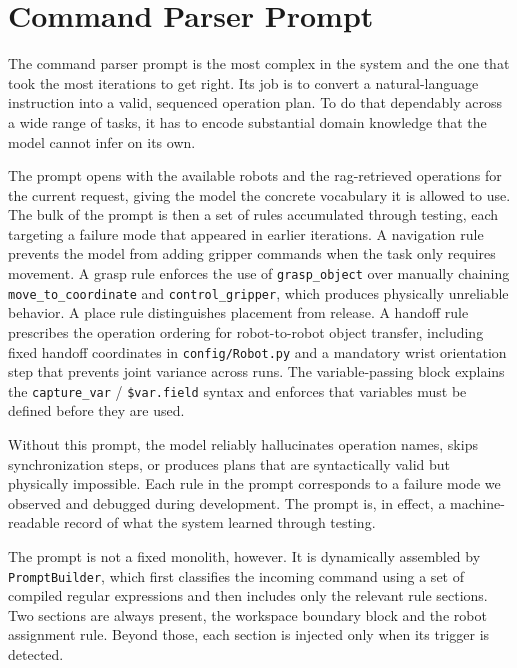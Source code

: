 \section{Command Parser Prompt}
The command parser prompt is the most complex in the system and the one that took the most iterations to get right. Its job is to convert a natural-language instruction into a valid, sequenced operation plan. To do that dependably across a wide range of tasks, it has to encode substantial domain knowledge that the model cannot infer on its own.

The prompt opens with the available robots and the \gls{rag}-retrieved operations for the current request, giving the model the concrete vocabulary it is allowed to use. The bulk of the prompt is then a set of rules accumulated through testing, each targeting a failure mode that appeared in earlier iterations. A navigation rule prevents the model from adding gripper commands when the task only requires movement. A grasp rule enforces the use of \texttt{grasp\_object} over manually chaining \texttt{move\_to\_coordinate} and \texttt{control\_gripper}, which produces physically unreliable behavior. A place rule distinguishes placement from release. A handoff rule prescribes the operation ordering for robot-to-robot object transfer, including fixed handoff coordinates in \texttt{config/Robot.py} and a mandatory wrist orientation step that prevents joint variance across runs. The variable-passing block explains the \texttt{capture\_var} / \texttt{\$var.field} syntax and enforces that variables must be defined before they are used.

Without this prompt, the model reliably hallucinates operation names, skips synchronization steps, or produces plans that are syntactically valid but physically impossible. Each rule in the prompt corresponds to a failure mode we observed and debugged during development. The prompt is, in effect, a machine-readable record of what the system learned through testing.

The prompt is not a fixed monolith, however. It is dynamically assembled by \texttt{PromptBuilder}, which first classifies the incoming command using a set of compiled regular expressions and then includes only the relevant rule sections. Two sections are always present, the workspace boundary block and the robot assignment rule. Beyond those, each section is injected only when its trigger is detected.

